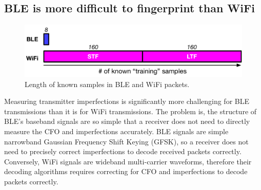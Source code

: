 \subsection{BLE is more difficult to fingerprint than WiFi} %
\label{sec:methodology:diff}

\begin{figure}
    \centering
    \includegraphics[width=\linewidth]{plots/knownsamples}
    \caption{
      Length of known samples in BLE and WiFi packets.
    \label{fig:training_length}
  }
\end{figure}


%
% 




Measuring transmitter imperfections is significantly more challenging for BLE
transmissions than it is for WiFi transmissions.
%
The problem is, the structure of BLE's baseband signals are so simple that a
receiver does not need to directly measure the CFO and \iq imperfections
accurately.  BLE signals are simple narrowband Gaussian Frequency Shift Keying
(GFSK), so a receiver does not need to precisely correct imperfections to
decode received packets correctly. 
%
Conversely, WiFi signals are wideband multi-carrier waveforms, therefore their
decoding algorithms requires correcting for CFO and \iq imperfections to decode
packets correctly.

